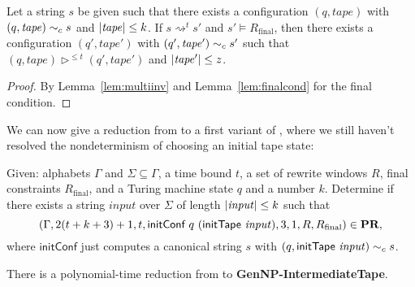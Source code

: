 \documentclass[a4paper,UKenglish,cleveref, autoref]{lipics-v2019}
\newcommand{\TODO}[1]{\ifthenelse{\isundefined{\showTODOs}}{}{\colorbox{red}{\LARGE TODO}:#1}}
\newcommand{\strent}{\rightsquigarrow}
\newcommand{\Rfinal}{R_{\text{final}}}
\begin{document}
  

\begin{theorem}[Soundness]\label{thm:simsound}
  Let a string $s$ be given such that there exists a configuration $(q, \mathit{tape})$ with $(q, \mathit{tape}) \sim_c{} s$ and $|\mathit{tape}| \le k$. If $s \strent^t s'$ and $s' \models \Rfinal$, then there exists a configuration $(q', \mathit{tape}')$ with $(q', \mathit{tape}') \sim_c{} s'$ such that $(q, \mathit{tape}) \rhd^{\le t} (q', \mathit{tape}')$ and $|\mathit{tape}'| \le z$. 
\end{theorem}
\begin{proof}
  By Lemma~\ref{lem:multiinv} and Lemma~\ref{lem:finalcond} for the final condition.
\end{proof}

We can now give a reduction from \gennp{} to a first variant of \strconrew{}, where we still haven't resolved the nondeterminism of choosing an initial tape state:
\begin{definition}\label{def:gennpinter}
  Given: alphabets $\Gamma$ and $\Sigma \subseteq \Gamma$, a time bound $t$, a set of rewrite windows $R$, final constraints $\Rfinal$, and a Turing machine state $q$ and a number $k$. 
  Determine if there exists a string $\mathit{input}$ over $\Sigma$ of length $|\mathit{input}| \le k$ such that 
  \[(\Gamma, 2 (t + k + 3) + 1, t, \textsf{initConf}~q~(\textsf{initTape}~\mathit{input}), 3, 1, R, \Rfinal) \in \strconrew{},\]
  where $\textsf{initConf}$ just computes a canonical string $s$ with $(q, \textsf{initTape}~\mathit{input}) \sim_c{} s$. 
\end{definition}
\begin{theorem}
  There is a polynomial-time reduction from \gennp{} to \textbf{GenNP-IntermediateTape}. 
\end{theorem}
\end{document}

